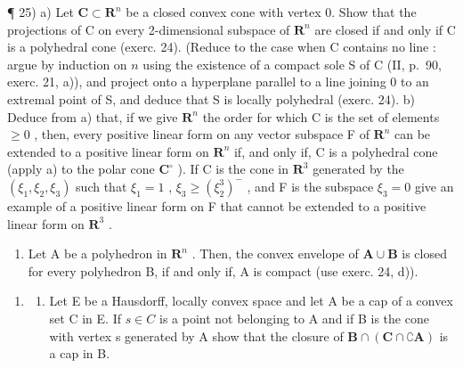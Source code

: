 ¶ 25) a) Let \(\mathbf{C} \subset \mathbf{R}^n\) be a closed convex cone with vertex 0. Show that the projections of C on every 2-dimensional subspace of \(\mathbf{R}^n\) are closed if and only if C is a polyhedral cone (exerc. 24). (Reduce to the case when C contains no line : argue by induction on \(n\) using the existence of a compact sole S of C (II, p.~90, exerc. 21, a)), and project onto a hyperplane parallel to a line joining 0 to an extremal point of S, and deduce that S is locally polyhedral (exerc. 24). b) Deduce from a) that, if we give \(\mathbf{R}^n\) the order for which C is the set of elements \(\geqslant 0\) , then, every positive linear form on any vector subspace F of \(\mathbf{R}^n\) can be extended to a positive linear form on \(\mathbf{R}^n\) if, and only if, C is a polyhedral cone (apply a) to the polar cone \(\mathbf{C}^\circ\) ). If C is the cone in \(\mathbf{R}^3\) generated by the \((\xi_1, \xi_2, \xi_3)\) such that \(\xi_1 = 1\) , \(\xi_3 \geqslant (\xi_2^3)^-\) , and F is the subspace \(\xi_3 = 0\) give an example of a positive linear form on F that cannot be extended to a positive linear form on \(\mathbf{R}^3\) .

\begin{enumerate}
\def\labelenumi{\alph{enumi})}
\setcounter{enumi}{2}
\tightlist
\item
  Let A be a polyhedron in \(\mathbf{R}^n\) . Then, the convex envelope of \(\mathbf{A} \cup \mathbf{B}\) is closed for every polyhedron B, if and only if, A is compact (use exerc. 24, d)).
\end{enumerate}

\begin{enumerate}
\def\labelenumi{\arabic{enumi})}
\setcounter{enumi}{25}
\tightlist
\item
  \begin{enumerate}
  \def\labelenumii{\alph{enumii})}
  \tightlist
  \item
    Let E be a Hausdorff, locally convex space and let A be a cap of a convex set C in E. If \(s \in C\) is a point not belonging to A and if B is the cone with vertex s generated by A show that the closure of \(\mathbf{B} \cap (\mathbf{C} \cap \complement\mathbf{A})\) is a cap in B.
  \end{enumerate}
\end{enumerate}

